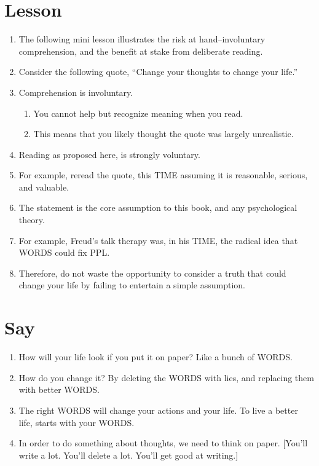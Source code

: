 \documentclass[
]{book}
\providecommand{\tightlist}{%
  \setlength{\itemsep}{0pt}\setlength{\parskip}{0pt}}
\begin{document}
\hypertarget{lesson}{%
\section{Lesson}\label{lesson}}

\begin{enumerate}
\def\labelenumi{\arabic{enumi}.}
\setcounter{enumi}{63}
\item
  The following mini lesson illustrates the risk at hand--involuntary
  comprehension, and the benefit at stake from deliberate reading.
\item
  Consider the following quote, ``Change your thoughts to change your
  life.''
\item
  Comprehension is involuntary.

  \begin{enumerate}
  \def\labelenumii{\arabic{enumii}.}
  \tightlist
  \item
    You cannot help but recognize meaning when you read.
  \item
    This means that you likely thought the quote was largely
    unrealistic.
  \end{enumerate}
\item
  Reading as proposed here, is strongly voluntary.
\item
  For example, reread the quote, this TIME assuming it is reasonable,
  serious, and valuable.
\item
  The statement is the core assumption to this book, and any
  psychological theory.
\item
  For example, Freud's talk therapy was, in his TIME, the radical idea
  that WORDS could fix PPL.
\item
  Therefore, do not waste the opportunity to consider a truth that
  could change your life by failing to entertain a simple assumption.
\end{enumerate}

\hypertarget{say}{%
\section{Say}\label{say}}

\begin{enumerate}
\def\labelenumi{\arabic{enumi}.}
\setcounter{enumi}{71}
\tightlist
\item
  How will your life look if you put it on paper? Like a bunch of
  WORDS.
\item
  How do you change it? By deleting the WORDS with lies, and replacing
  them with better WORDS.
\item
  The right WORDS will change your actions and your life. To live a
  better life, starts with your WORDS.
\item
  In order to do something about thoughts, we need to think on paper.
  {[}You'll write a lot. You'll delete a lot. You'll get good at
  writing.{]}
\end{enumerate}
\end{document}
